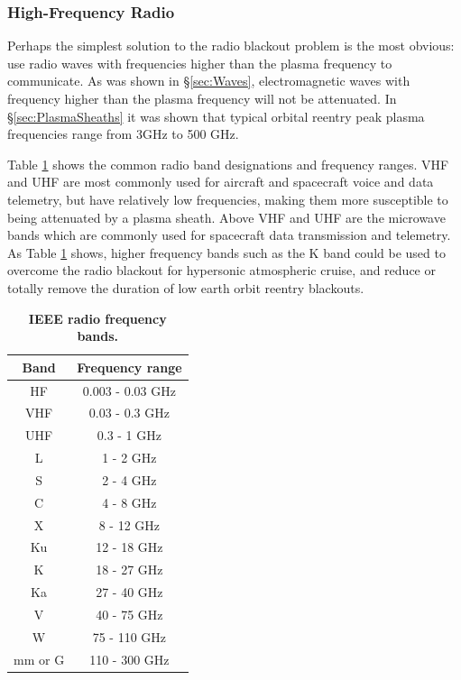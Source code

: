 \documentclass[twocolumn]{article}
\begin{document}
		\subsubsection*{High-Frequency Radio}
			Perhaps the simplest solution to the radio blackout problem is the most obvious: use radio waves with frequencies higher than the plasma frequency to communicate.
			As was shown in \S\ref{sec:Waves}, electromagnetic waves with frequency higher than the plasma frequency will not be attenuated.
			In \S\ref{sec:PlasmaSheaths} it was shown that typical orbital reentry peak plasma frequencies range from 3GHz to 500 GHz.
			
			Table \ref{tab:RadioBands} shows the common radio band designations and frequency ranges.
			VHF and UHF are most commonly used for aircraft and spacecraft voice and data telemetry, but have relatively low frequencies, making them more susceptible to being attenuated by a plasma sheath.
			Above VHF and UHF are the microwave bands which are commonly used for spacecraft data transmission and telemetry.
			As Table \ref{tab:RadioBands} shows, higher frequency bands such as the K band could be used to overcome the radio blackout for hypersonic atmospheric cruise, and reduce or totally remove the duration of low earth orbit reentry blackouts.
			
			\begin{table}[H]	
				\centering
				\begin{tabular}{c|c}
					Band    & Frequency range   \\ \hline
					HF      & 0.003 - 0.03 GHz \\
					VHF     & 0.03 - 0.3 GHz   \\
					UHF     & 0.3 - 1 GHz      \\
					L       & 1 - 2 GHz        \\
					S       & 2 - 4 GHz        \\
					C       & 4 - 8 GHz        \\
					X       & 8 - 12 GHz       \\
					Ku      & 12 - 18 GHz      \\
					K       & 18 - 27 GHz      \\
					Ka      & 27 - 40 GHz      \\
					V       & 40 - 75 GHz      \\
					W       & 75 - 110 GHz     \\
					mm or G & 110 - 300 GHz​  
				\end{tabular}
				\caption{\textbf{IEEE radio frequency bands.}}
				\label{tab:RadioBands}
			\end{table}
			
\end{document}
